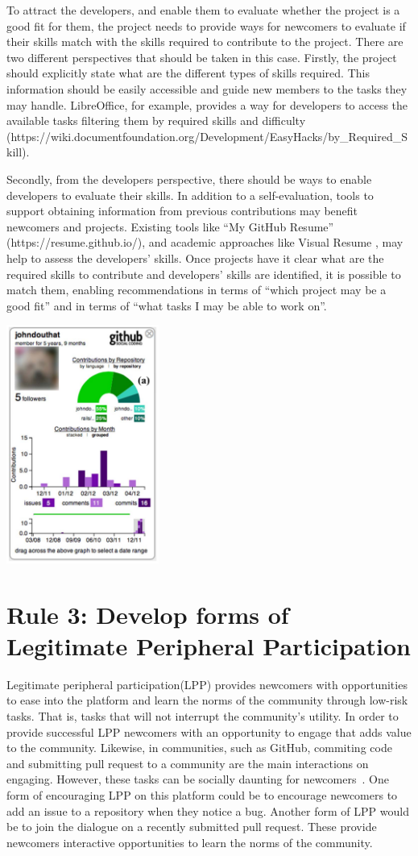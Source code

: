 \documentclass[10pt,letterpaper]{article}
\newcommand{\rulemajor}[1]{\section{#1}}
\begin{document}
To attract the developers,
and enable them to evaluate whether the project is a good fit for them,
the project needs to provide ways for newcomers to evaluate if their skills match with the skills required to contribute to the project.
There are two different perspectives that should be taken in this case.
Firstly,
the project should explicitly state what are the different types of skills required.
This information should be easily accessible and guide new members to the tasks they may handle.
LibreOffice,
for example,
provides a way for developers to access the available tasks filtering them by required skills and difficulty
(https://wiki.documentfoundation.org/Development/EasyHacks/by\_Required\_Skill).

Secondly,
from the developers perspective,
there should be ways to enable developers to evaluate their skills.
In addition to a self-evaluation,
tools to support obtaining information from previous contributions may benefit newcomers and projects.
Existing tools like ``My GitHub Resume'' (https://resume.github.io/),
and academic approaches like Visual Resume \cite{b:sarma},
may help to assess the developers' skills.
Once projects have it clear what are the required skills to contribute and developers' skills are identified,
it is possible to match them,
enabling recommendations in terms of ``which project may be a good fit''
and in terms of ``what tasks I may be able to work on''.

\includegraphics[width=5.0cm]{contributions.png}

\rulemajor{Rule 3: Develop forms of Legitimate Peripheral Participation}

Legitimate peripheral participation(LPP) provides newcomers with opportunities to ease into the platform and learn the norms of the community through low-risk tasks. That is, tasks that will not interrupt the community’s utility. In order to provide successful LPP newcomers with an opportunity to engage that adds value to the community. Likewise, in communities, such as GitHub, commiting code and submitting pull request to a community are the main interactions on engaging. However, these tasks can be socially daunting for newcomers~\cite{steinmacher2015social}. One form of encouraging LPP on this platform could be to encourage newcomers to add an issue to a repository when they notice a bug. Another form of LPP would be to join the dialogue on a recently submitted pull request. These provide newcomers interactive opportunities to learn the norms of the community. 
\end{document}
